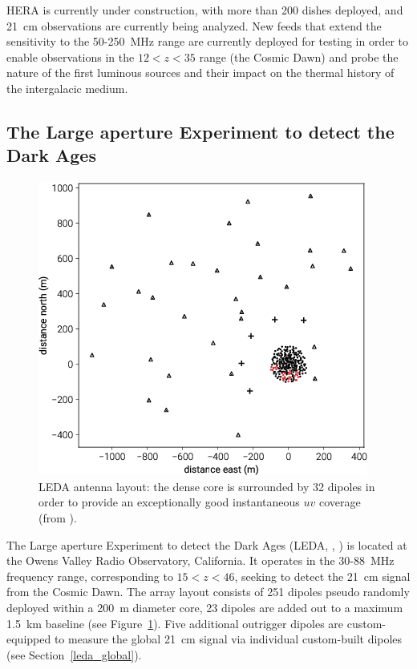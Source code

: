 HERA is currently under construction, with more than 200 dishes deployed, and 21~cm observations are currently being analyzed. New feeds that extend the sensitivity to the 50-250~MHz range are currently deployed for testing in order to enable observations in the $12 < z < 35$ range (the Cosmic Dawn) and probe the nature of the first luminous sources and their impact on the thermal history of the intergalacic medium.



\subsection{The Large aperture Experiment to detect the Dark Ages}
\label{section:leda_pspec}
\begin{figure}[]
\begin{center}
\includegraphics[width=1.\textwidth]{Koopmans_Bernardi/lwa_layout}
\end{center}
\caption{LEDA antenna layout: the dense core is surrounded by 32 dipoles in order to provide an exceptionally good instantaneous $uv$ coverage (from \cite{eastwood18}).}
\label{fig:fig_leda}
\end{figure}
The Large aperture Experiment to detect the Dark Ages (LEDA, \cite{bernardi15}, \cite{kocz15}) is located at the Owens Valley Radio Observatory, California. It operates in the 30-88~MHz frequency range, corresponding to $15 < z < 46$, seeking to detect the 21~cm signal from the Cosmic Dawn.   
The array layout consists of 251 dipoles pseudo randomly deployed within a 200~m diameter core, 23 dipoles are added out to a maximum 1.5~km baseline (see Figure~\ref{fig:fig_leda}). Five additional outrigger dipoles are custom-equipped to measure the global 21~cm signal via individual custom-built dipoles (see Section~\ref{leda_global}).

